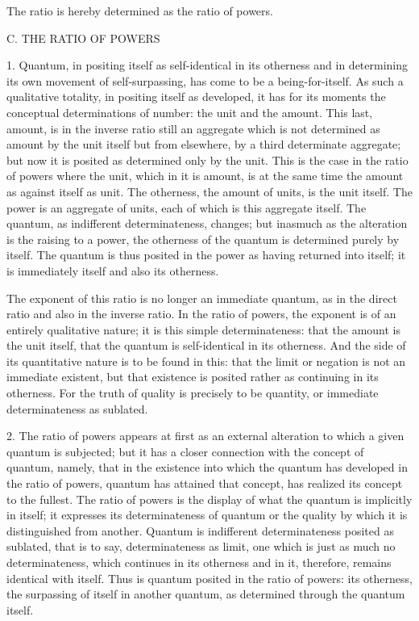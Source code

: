 The ratio is hereby determined as the ratio of powers.

C. THE RATIO OF POWERS

1. Quantum, in positing itself as self-identical in its otherness
and in determining its own movement of self-surpassing,
has come to be a being-for-itself.
As such a qualitative totality, in positing itself as developed,
it has for its moments the conceptual determinations of number:
the unit and the amount.
This last, amount, is in the inverse ratio still an aggregate
which is not determined as amount by the unit itself but from elsewhere,
by a third determinate aggregate;
but now it is posited as determined only by the unit.
This is the case in the ratio of powers where the unit,
which in it is amount, is at the same time
the amount as against itself as unit.
The otherness, the amount of units, is the unit itself.
The power is an aggregate of units,
each of which is this aggregate itself.
The quantum, as indifferent determinateness, changes;
but inasmuch as the alteration is the raising to a power,
the otherness of the quantum is determined purely by itself.
The quantum is thus posited in the power as having returned into itself;
it is immediately itself and also its otherness.

The exponent of this ratio is no longer an immediate quantum,
as in the direct ratio and also in the inverse ratio.
In the ratio of powers, the exponent
is of an entirely qualitative nature;
it is this simple determinateness:
that the amount is the unit itself,
that the quantum is self-identical in its otherness.
And the side of its quantitative nature is to be found in this:
that the limit or negation is not an immediate existent,
but that existence is posited rather
as continuing in its otherness.
For the truth of quality is precisely to be quantity,
or immediate determinateness as sublated.

2. The ratio of powers appears at first as
an external alteration to which a given quantum is subjected;
but it has a closer connection with the concept of quantum,
namely, that in the existence into which the quantum
has developed in the ratio of powers,
quantum has attained that concept,
has realized its concept to the fullest.
The ratio of powers is the display of
what the quantum is implicitly in itself;
it expresses its determinateness of quantum
or the quality by which it is distinguished from another.
Quantum is indifferent determinateness posited as sublated,
that is to say, determinateness as limit,
one which is just as much no determinateness,
which continues in its otherness and in it,
therefore, remains identical with itself.
Thus is quantum posited in the ratio of powers:
its otherness, the surpassing of itself in another quantum,
as determined through the quantum itself.

